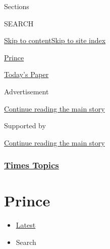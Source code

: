 Sections

SEARCH

\protect\hyperlink{site-content}{Skip to
content}\protect\hyperlink{site-index}{Skip to site index}

\href{https://www.nytimes3xbfgragh.onion/topic/person/prince}{Prince}

\href{https://myaccount.nytimes3xbfgragh.onion/auth/login?response_type=cookie\&client_id=vi}{}

\href{https://www.nytimes3xbfgragh.onion/section/todayspaper}{Today's
Paper}

Advertisement

\protect\hyperlink{after-top}{Continue reading the main story}

Supported by

\protect\hyperlink{after-sponsor}{Continue reading the main story}

\hypertarget{times-topics}{%
\subsubsection{\texorpdfstring{\href{/index.html}{Times
Topics}}{Times Topics}}\label{times-topics}}

\hypertarget{prince}{%
\section{Prince}\label{prince}}

\begin{itemize}
\tightlist
\item
  \protect\hyperlink{stream-panel}{Latest}
\item
  Search
\end{itemize}

